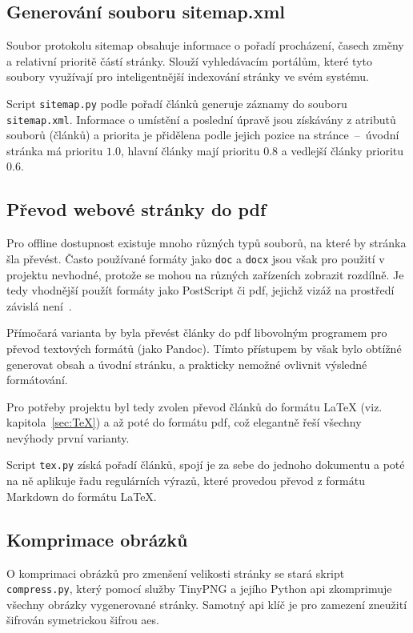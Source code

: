 \documentclass[a4paper, 12pt]{article}
\newcommand*{\fullref}[1]{\hyperref[{#1}]{\ref*{#1}}}
\begin{document}
  \subsection{Generování souboru sitemap.xml}
  Soubor protokolu sitemap obsahuje informace o pořadí procházení, časech změny a relativní prioritě částí stránky. Slouží vyhledávacím portálům, které tyto soubory využívají pro inteligentnější indexování stránky ve svém systému.

  Script \texttt{sitemap.py} podle pořadí článků generuje záznamy do souboru \texttt{sitemap.xml}. Informace o umístění a poslední úpravě jsou získávány z atributů souborů (článků) a priorita je přidělena podle jejich pozice na stránce~--~úvodní stránka má prioritu $1.0$, hlavní články mají prioritu $0.8$ a vedlejší články prioritu $0.6$.


  \subsection{Převod webové stránky do \acrshort{pdf}} \label{sec:Převod webové stránky do PDF}
  Pro offline dostupnost existuje mnoho různých typů souborů, na které by stránka šla převést. Často používané formáty jako \texttt{doc} a \texttt{docx} jsou však pro použití v projektu nevhodné, protože se mohou na různých zařízeních zobrazit rozdílně. Je tedy vhodnější použít formáty jako PostScript či \gls{pdf}, jejichž vizáž na prostředí závislá není~\cite{history-of-pdf}.

  Přímočará varianta by byla převést články do \gls{pdf} libovolným programem pro převod textových formátů (jako Pandoc). Tímto přístupem by však bylo obtížné generovat obsah a úvodní stránku, a prakticky nemožné ovlivnit výsledné formátování.

  Pro potřeby projektu byl tedy zvolen převod článků do formátu \LaTeX{} (viz. kapitola~\fullref{sec:TeX}) a až poté do formátu \gls{pdf}, což elegantně řeší všechny nevýhody první varianty.

  Script \texttt{tex.py} získá pořadí článků, spojí je za sebe do jednoho dokumentu a poté na ně aplikuje řadu regulárních výrazů, které provedou převod z formátu Markdown do formátu \LaTeX.


  \subsection{Komprimace obrázků}
  O komprimaci obrázků pro zmenšení velikosti stránky se stará skript \texttt{compress.py}, který pomocí služby TinyPNG a jejího Python \gls{api} zkomprimuje všechny obrázky vygenerované stránky. Samotný \gls{api} klíč je pro zamezení zneužití šifrován symetrickou šifrou \gls{aes}.
\end{document}
